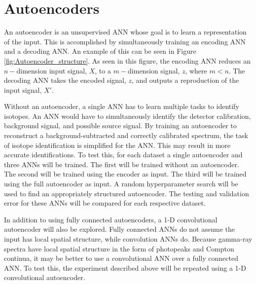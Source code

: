 \documentclass[tocnosub,noragright,centerchapter,12pt,fullpage]{uiucecethesis09}
\begin{document}
\section{Autoencoders} \label{Autoencoders}


An autoencoder is an unsupervised ANN whose goal is to learn a representation of the input. This is accomplished by simultaneously training an encoding ANN and a decoding ANN. An example of this can be seen in Figure \ref{fig:Autoencoder_structure}. As seen in this figure, the encoding ANN reduces an $n-$dimension input signal, $X$, to a $m-$dimension signal, $z$, where $m < n$. The decoding ANN takes the encoded signal, $z$, and outputs a reproduction of the input signal, $X'$.


Without an autoencoder, a single ANN has to learn multiple tasks to identify isotopes. An ANN would have to simultaneously identify the detector calibration, background signal, and possible source signal. By training an autoencoder to reconstruct a background-subtracted and correctly calibrated spectrum, the task of isotope identification is simplified for the ANN. This may result in more accurate identifications. To test this, for each dataset a single autoencoder and three ANNs will be trained. The first will be trained without an autoencoder. The second will be trained using the encoder as input. The third will be trained using the full autoencoder as input. A random hyperparameter search will be used to find an appropriately structured autoencoder. The testing and validation error for these ANNs will be compared for each respective dataset.

In addition to using fully connected autoencoders, a 1-D convolutional autoencoder will also be explored. Fully connected ANNs do not assume the input has local spatial structure, while convolution ANNs do. Because gamma-ray spectra have local spatial structure in the form of photopeaks and Compton continua, it may be better to use a convolutional ANN over a fully connected ANN. To test this, the experiment described above will be repeated using a 1-D convolutional autoencoder.

\end{document}
